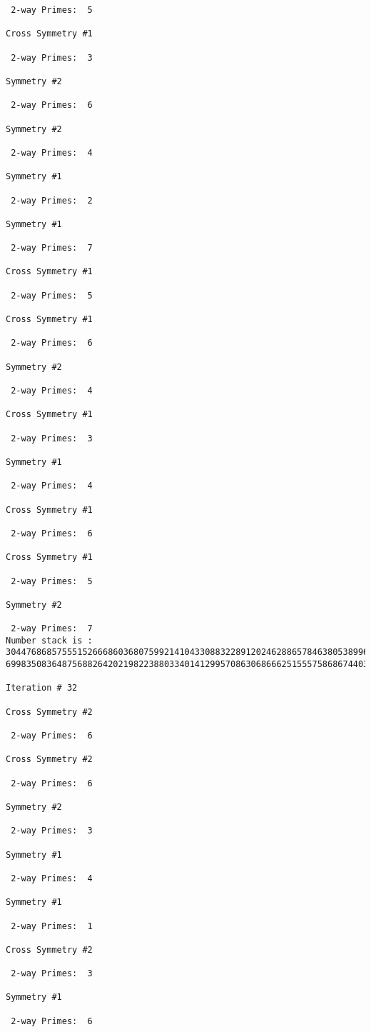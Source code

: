 {{{{\begin{verbatim}
 2-way Primes: 	5

Cross Symmetry #1

 2-way Primes: 	3

Symmetry #2

 2-way Primes: 	6

Symmetry #2

 2-way Primes: 	4

Symmetry #1

 2-way Primes: 	2

Symmetry #1

 2-way Primes: 	7

Cross Symmetry #1

 2-way Primes: 	5

Cross Symmetry #1

 2-way Primes: 	6

Symmetry #2

 2-way Primes: 	4

Cross Symmetry #1

 2-way Primes: 	3

Symmetry #1

 2-way Primes: 	4

Cross Symmetry #1

 2-way Primes: 	6

Cross Symmetry #1

 2-way Primes: 	5

Symmetry #2

 2-way Primes: 	7
Number stack is :
30447686857555152666860368075992141043308832289120246288657846380538996794608835958544046240163340857
69983508364875688264202198223880334014129957086306866625155575868674403758043361042640445859538806497

Iteration #	32

Cross Symmetry #2

 2-way Primes: 	6

Cross Symmetry #2

 2-way Primes: 	6

Symmetry #2

 2-way Primes: 	3

Symmetry #1

 2-way Primes: 	4

Symmetry #1

 2-way Primes: 	1

Cross Symmetry #2

 2-way Primes: 	3

Symmetry #1

 2-way Primes: 	6


\end{verbatim}}}}}
